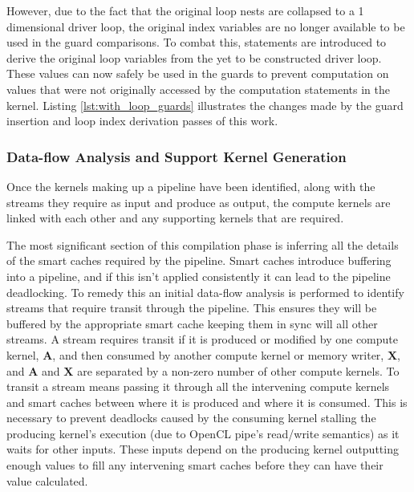 \documentclass{mpaper}
\begin{document}
However, due to the fact that the original loop nests are collapsed to a 1 dimensional driver loop, the original index variables are no longer available to be used in the guard comparisons.
To combat this, statements are introduced to derive the original loop variables from the yet to be constructed driver loop.
These values can now safely be used in the guards to prevent computation on values that were not originally accessed by the computation statements in the kernel.
Listing \ref{lst:with_loop_guards} illustrates the changes made by the guard insertion and loop index derivation passes of this work.


\subsubsection*{Data-flow Analysis and Support Kernel Generation}
\label{data_flow_analysis_and_support_kernel_generation}

Once the kernels making up a pipeline have been identified, along with the streams they require as input and produce as output, the compute kernels are linked with each other and any supporting kernels that are required.

The most significant section of this compilation phase is inferring all the details of the smart caches required by the pipeline.
Smart caches introduce buffering into a pipeline, and if this isn't applied consistently it can lead to the pipeline deadlocking. 
To remedy this an initial data-flow analysis is performed to identify streams that require transit through the pipeline.
This ensures they will be buffered by the appropriate smart cache keeping them in sync will all other streams.
A stream requires transit if it is produced or modified by one compute kernel, $\textbf{A}$, and then consumed by another compute kernel or memory writer, $\textbf{X}$, and $\textbf{A}$ and $\textbf{X}$ are separated by a non-zero number of other compute kernels. 
To transit a stream means passing it through all the intervening compute kernels and smart caches between where it is produced and where it is consumed.
This is necessary to prevent deadlocks caused by the consuming kernel stalling the producing kernel's execution (due to OpenCL pipe's read/write semantics) as it waits for other inputs.
These inputs depend on the producing kernel outputting enough values to fill any intervening smart caches before they can have their value calculated.
\end{document}
